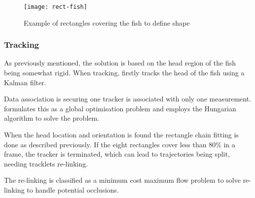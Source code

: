 \begin{figure}[h]
  \centering
  \texttt{[image: rect-fish]}
  \caption{Example of rectangles covering the fish to define shape \citep{HongWang2016}}
  \label{fig:rect-fish}
\end{figure}

\subsubsection{Tracking}
As previously mentioned, the solution is based on the head region of the fish being somewhat rigid. When tracking, \cite{HongWang2016} firstly tracks the head of the fish using a Kalman filter. 

Data association is securing one tracker is associated with only one measurement. \cite{HongWang2016} formulates this as a global optimisation problem and employs the Hungarian algorithm to solve the problem.

When the head location and orientation is found the rectangle chain fitting is done as described previously. If the eight rectangles cover less than $80\%$ in a frame, the tracker is terminated, which can lead to trajectories being split, needing tracklets re-linking.

The re-linking is classified as a minimum cost maximum flow problem to solve re-linking to handle potential occlusions.
